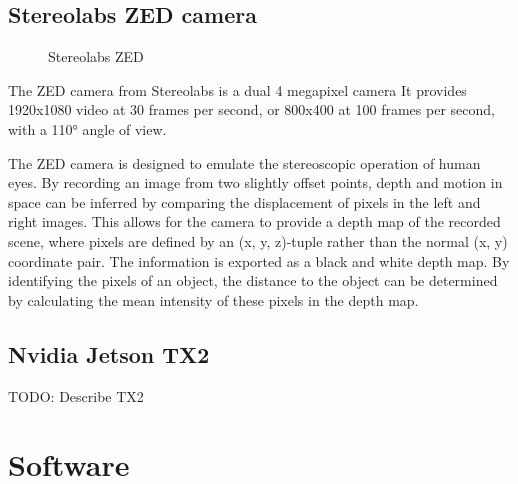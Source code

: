 \documentclass[\rootfolder/main.tex]{subfiles}
\begin{document}

\subsection{Stereolabs ZED camera}

\begin{figure}
    \caption{Stereolabs ZED}
    \label{fig:zed-camera}
\end{figure}

The ZED camera from Stereolabs is a dual 4 megapixel camera
It provides 1920x1080 video at 30 frames per second, or 800x400 at 100 frames per second, with a \ang{110} angle of view.

The ZED camera is designed to emulate the stereoscopic operation of human eyes.
By recording an image from two slightly offset points, depth and motion in space can be inferred by comparing the displacement of pixels in the left and right images.
This allows for the camera to provide a depth map of the recorded scene, where pixels are defined by an (x, y, z)-tuple rather than the normal (x, y) coordinate pair.
The information is exported as a black and white depth map.
By identifying the pixels of an object, the distance to the object can be determined by calculating the mean intensity of these pixels in the depth map.


\subsection{Nvidia Jetson TX2}

TODO: Describe TX2


\section{Software}
\end{document}
